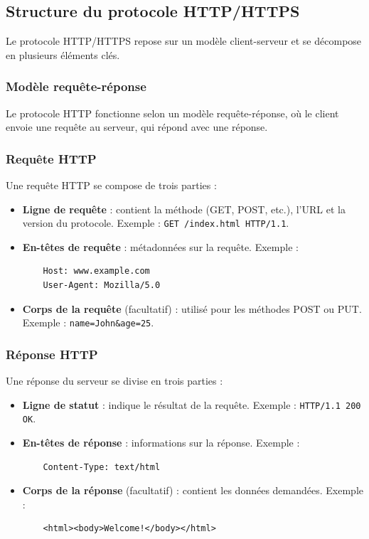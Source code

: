\subsection{Structure du protocole HTTP/HTTPS}

Le protocole HTTP/HTTPS repose sur un modèle client-serveur et se décompose en plusieurs éléments clés.

\subsubsection{Modèle requête-réponse}
Le protocole HTTP fonctionne selon un modèle requête-réponse, où le client envoie une requête au serveur, qui répond avec une réponse.

\subsubsection*{Requête HTTP}
Une requête HTTP se compose de trois parties :
\begin{itemize}
	\item \textbf{Ligne de requête} : contient la méthode (GET, POST, etc.), l'URL et la version du protocole. Exemple : \texttt{GET /index.html HTTP/1.1}.
	\item \textbf{En-têtes de requête} : métadonnées sur la requête. Exemple :
	\begin{verbatim}
	Host: www.example.com
	User-Agent: Mozilla/5.0
	\end{verbatim}
	\item \textbf{Corps de la requête} (facultatif) : utilisé pour les méthodes POST ou PUT. Exemple : \texttt{name=John\&age=25}.
\end{itemize}

\subsubsection*{Réponse HTTP}
Une réponse du serveur se divise en trois parties :
\begin{itemize}
	\item \textbf{Ligne de statut} : indique le résultat de la requête. Exemple : \texttt{HTTP/1.1 200 OK}.
	\item \textbf{En-têtes de réponse} : informations sur la réponse. Exemple :
	\begin{verbatim}
	Content-Type: text/html
	\end{verbatim}
	\item \textbf{Corps de la réponse} (facultatif) : contient les données demandées. Exemple :
	\begin{verbatim}
	<html><body>Welcome!</body></html>
	\end{verbatim}
\end{itemize}

